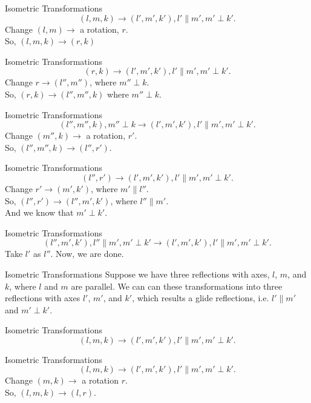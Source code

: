 \documentclass{beamer}
\begin{document}
\begin{frame}{Isometric Transformations}
	\[
		(l, m, k) \to (l', m', k'), l'\parallel m', m'\perp k'
	.\] 
	Change $(l, m) \to$ a rotation, $r$. \\

	So, $(l, m, k) \to (r, k)$
\end{frame}
\begin{frame}{Isometric Transformations}
	\[
		(r, k) \to (l', m', k'), l'\parallel m', m'\perp k'
	.\] 
	Change $r\to (l'', m'')$, where $m''\perp k$.\\

	So, $(r, k)\to (l'', m'', k)$ where $m''\perp k$.
\end{frame}
\begin{frame}{Isometric Transformations}
	\[
		(l'', m'', k), m''\perp k 
		\to (l', m', k'), l'\parallel m', m'\perp k'
	.\] 
	Change $(m'', k) \to$ a rotation, $r'$.\\

	So, $(l'', m'', k) \to (l'', r')$.
\end{frame}
\begin{frame}{Isometric Transformations}
	\[
		(l'',r')
		\to (l', m', k'), l'\parallel m', m'\perp k'
	.\] 
	Change $r'\to (m', k')$, where $m'\parallel l''$.\\

	So, $(l'', r')\to  (l'', m', k')$, where $l''\parallel m'$.\\

	And we know that $m'\perp k'$.
\end{frame}
\begin{frame}{Isometric Transformations}
	\[
		(l'',m', k'), l''\parallel m', m'\perp k'
		\to (l', m', k'), l'\parallel m', m'\perp k'
	.\] 
	Take $l'$ as $l''$. Now, we are done.
\end{frame}
\begin{frame}{Isometric Transformations}
	Suppose we have three reflections with axes, $l$, $m$, and $k$,
	where $l$ and $m$ are parallel. We can can these transformations
	into three reflections with axes $l'$, $m'$, and $k'$, which 
	results a glide reflections, i.e. $l'\parallel m'$ and $m'\perp k'$.
\end{frame}
\begin{frame}{Isometric Transformations}
	\[
		(l, m, k)\to (l', m', k'), l' \parallel m', m'\perp k'
	.\] 
\end{frame}
\begin{frame}{Isometric Transformations}
	\[
		(l, m, k)\to (l', m', k'), l' \parallel m', m'\perp k'
	.\] 
	Change $(m, k)\to$ a rotation $r$.\\

	So, $(l,m, k)\to (l, r)$.
\end{frame}
\end{document}
